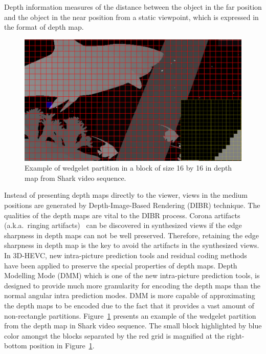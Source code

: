 Depth information measures of the distance between the object in the far position
and the object in the near position from a static viewpoint,
which is expressed in the format of depth map.
\begin{figure}[!t]
    \centering
    \includegraphics[width=\textwidth,height=\textheight,keepaspectratio]{Figures/wedgelet}
    \caption[Wedgelet partition illustration]
    {Example of wedgelet partition in a block of size 
    16 by 16 in depth map
    from Shark video sequence.
    }\label{fig:wedgelet-partition}
\end{figure}
Instead of presenting depth maps directly to the viewer, views in the medium
positions are generated by Depth-Image-Based Rendering (DIBR) technique.
The qualities of the depth maps are vital to the DIBR process.
Corona artifacts (a.k.a.\ ringing artifacts)~\parencite{RN44}
can be discovered in synthesized
views if the edge sharpness in depth maps can not be well
preserved.
Therefore, retaining the edge sharpness in depth map is the key to avoid the
artifacts in the synthesized views.
In 3D-HEVC, new intra-picture prediction tools and residual coding methods
have been applied to preserve the special properties of depth maps.
Depth Modelling Mode (DMM) which is one of the new intra-picture
prediction tools, is designed to provide much more granularity for
encoding the depth maps than the normal angular intra prediction modes.
DMM is more capable of approximating the depth maps to be encoded due to
the fact that it provides a vast amount of non-rectangle partitions.
Figure~\ref{fig:wedgelet-partition} presents an example of the wedgelet
partition from the depth map in Shark video sequence.
The small block highlighted by blue color amongst the blocks
separated by the red grid is magnified at the right-bottom position in
Figure~\ref{fig:wedgelet-partition}.
